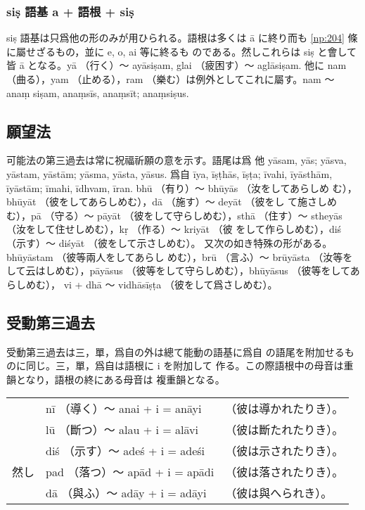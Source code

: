 \subsubsection[siṣ 語基]{siṣ 語基 a + 語根 + siṣ}
\numberParagraph
siṣ 語基は只爲他の形のみが用ひられる。語根は多くは
ā に終り而も \ref{np:204} 條に屬せざるもの，並に e, o, ai 等に終るも
のである。然しこれらは siṣ と會して皆 ā となる。yā （行く）～
ayāsiṣam, glai （疲困す）～ aglāsiṣam. 他に nam （曲る），yam
（止める），ram （樂む）は例外としてこれに屬す。nam ～ anaṃ\-%
siṣam, anaṃsīs, anaṃsīt; anaṃsiṣus.

\subsection{願望法}
\numberParagraph
可能法の第三過去は常に祝福祈願の意を示す。語尾は爲
他 yāsam, yās; yāsva, yāstam, yāstām; yāsma, yāsta,
yāsus. 爲自 īya, īṣṭhās, īṣṭa; īvahi, īyāsthām, īyāstām;
īmahi, īdhvam, īran. bhū （有り）～ bhūyās （汝をしてあらしめ
む），bhūyāt （彼をしてあらしめむ），dā （施す）～ deyāt （彼をし
て施さしめむ），pā （守る）～ pāyāt （彼をして守らしめむ），sthā
（住す）～ stheyās （汝をして住せしめむ），kṛ （作る）～ kriyāt （彼
をして作らしめむ），diś （示す）～ diśyāt （彼をして示さしめむ）。
又次の如き特殊の形がある。bhūyāstam （彼等兩人をしてあらし
めむ），brū （言ふ）～ brūyāsta （汝等をして云はしめむ），pāyāsus
（彼等をして守らしめむ），bhūyāsus （彼等をしてあらしめむ），
vi + dhā ～ vidhāsīṣṭa （彼をして爲さしめむ）。

\subsection{受動第三過去}
\numberParagraph
受動第三過去は三，單，爲自の外は總て能動の語基に爲自
の語尾を附加せるものに同じ。三，單，爲自は語根に i を附加して
作る。この際語根中の母音は重韻となり，語根の終にある母音は
複重韻となる。

\begin{center}
\begin{tabular}{lll}
       & nī （導く）～ anai + i = anāyi  & （彼は導かれたりき）。\\
       & lū （斷つ）～ alau + i = alāvi  & （彼は斷たれたりき）。\\
       & diś （示す）～ adeś + i = adeśi & （彼は示されたりき）。\\
  然し & pad （落つ）～ apād + i = apādi & （彼は落されたりき）。\\
       & dā （與ふ）～ adāy + i = adāyi  & （彼は與へられき）。
\end{tabular}
\end{center}

